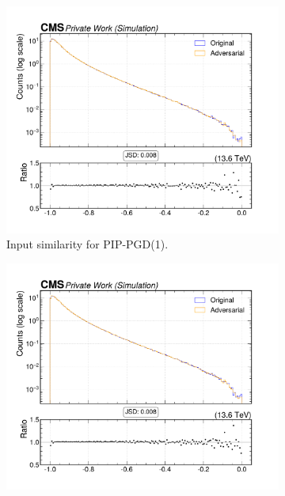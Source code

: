 \begin{figure}[htbp]
  \centering
  \begin{subfigure}[t]{0.32\textwidth}
    \includegraphics[width=\linewidth]{media/output/features/compare/combined_it_1/cmp_cpf_arr_Cpfcan_ptrel.pdf}
    \caption*{Input similarity for PIP-PGD(1).}
  \end{subfigure}\hfill
  \begin{subfigure}[t]{0.32\textwidth}
    \includegraphics[width=\linewidth]{media/output/features/compare/combined_it_2/cmp_cpf_arr_Cpfcan_ptrel.pdf}

\end{subfigure}
\end{figure}
